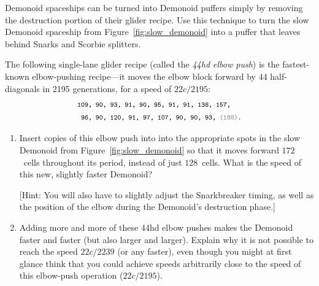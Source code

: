 \begin{multicols}{2}
	\mfilbreak
	
	
	\begin{problem}\label{exer:demonoid_turn_into_puffer}
		Demonoid spaceships can be turned into Demonoid puffers simply by removing the destruction portion of their glider recipe. Use this technique to turn the slow Demonoid spaceship from Figure~\ref{fig:slow_demonoid} into a puffer that leaves behind Snarks and Scorbie splitters.
	\end{problem}
	
	
	\mfilbreak
	
	
	\begin{problemstar}\label{exer:44hd_elbow_push}
		The following single-lane glider recipe (called the \emph{44hd elbow push}) is the fastest-known elbow-pushing recipe---it moves the elbow block forward by $44$ half-diagonals in 2195 generations, for a speed of $22c/2195$:
		\begin{align*}
		& \text{\texttt{\footnotesize 109, 90, 93, 91, 90, 95, 91, 91, 138, 157,}} \\
		& \text{\texttt{\footnotesize~96, 90, 120, 91, 97, 107, 90, 90, 93, {\color{gray}(188)}.}}
		\end{align*}
		
		\begin{center}
			\centering
		\end{center}
		
		\begin{enumerate}[label=\bf\color{ocre}(\alph*)]
			\item Insert copies of this elbow push into into the appropriate spots in the slow Demonoid from Figure~\ref{fig:slow_demonoid} so that it moves forward $172$~cells throughout its period, instead of just $128$~cells. What is the speed of this new, slightly faster Demonoid?
			
			[Hint: You will also have to slightly adjust the Snarkbreaker timing, as well as the position of the elbow during the Demonoid's destruction phase.]
			
			\item Adding more and more of these 44hd elbow pushes makes the Demonoid faster and faster (but also larger and larger). Explain why it is not possible to reach the speed $22c/2239$ (or any faster), even though you might at first glance think that you could achieve speeds arbitrarily close to the speed of this elbow-push operation ($22c/2195$).
		\end{enumerate}
	\end{problemstar}



\end{multicols}
